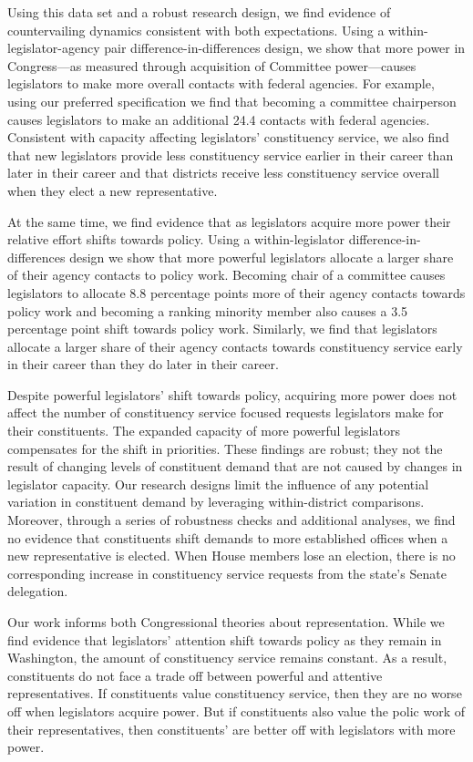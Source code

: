 \documentclass[12pt]{article}
\begin{document}
Using this data set and a robust research design, we find evidence of countervailing dynamics consistent with both expectations.  Using a within-legislator-agency pair difference-in-differences design, we show that more power in Congress---as measured through acquisition of Committee power---causes legislators to make more overall contacts with federal agencies.  For example, using our preferred specification we find that becoming a committee chairperson causes legislators to make an additional 24.4 contacts with federal agencies. Consistent with capacity affecting legislators' constituency service, we also find that new legislators provide less constituency service earlier in their career than later in their career and that districts receive less constituency service overall when they elect a new representative.  

At the same time, we find evidence that as legislators acquire more power their relative effort shifts towards policy. Using a within-legislator difference-in-differences design we show that more powerful legislators allocate a larger share of their agency contacts to policy work.  Becoming chair of a committee causes legislators to allocate 8.8 percentage points more of their agency contacts towards policy work and becoming a ranking minority member also causes a 3.5 percentage point shift towards policy work. Similarly, we find that legislators allocate a larger share of their agency contacts towards constituency service early in their career than they do later in their career.   

Despite powerful legislators' shift towards policy, acquiring more power does not affect the number of constituency service focused requests legislators make for their constituents.  The expanded capacity of more powerful legislators compensates for the shift in priorities. These findings are robust; they not the result of changing levels of constituent demand that are not caused by changes in legislator capacity. Our research designs limit the influence of any potential variation in constituent demand by leveraging within-district comparisons.  Moreover, through a series of robustness checks and additional analyses, we find no evidence that constituents shift demands to more established offices when a new representative is elected. When House members lose an election, there is no corresponding increase in constituency service requests from the state's Senate delegation. 

Our work informs both Congressional theories about representation.  While we find evidence that legislators' attention shift towards policy as they remain in Washington, the amount of constituency service remains constant.  As a result, constituents do not face a trade off between powerful and attentive representatives.   If constituents value constituency service, then they are no worse off when legislators acquire power.  But if constituents also value the polic work of their representatives, then constituents' are better off with legislators with more power. 
\end{document}
